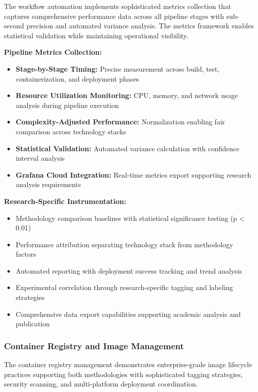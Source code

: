 The workflow automation implements sophisticated metrics collection that captures comprehensive performance data across all pipeline stages with sub-second precision and automated variance analysis. The metrics framework enables statistical validation while maintaining operational visibility.

\textbf{Pipeline Metrics Collection:}
\begin{itemize}
\item \textbf{Stage-by-Stage Timing:} Precise measurement across build, test, containerization, and deployment phases
\item \textbf{Resource Utilization Monitoring:} CPU, memory, and network usage analysis during pipeline execution
\item \textbf{Complexity-Adjusted Performance:} Normalization enabling fair comparison across technology stacks
\item \textbf{Statistical Validation:} Automated variance calculation with confidence interval analysis
\item \textbf{Grafana Cloud Integration:} Real-time metrics export supporting research analysis requirements
\end{itemize}

\textbf{Research-Specific Instrumentation:}
\begin{itemize}
\item Methodology comparison baselines with statistical significance testing (p < 0.01)
\item Performance attribution separating technology stack from methodology factors
\item Automated reporting with deployment success tracking and trend analysis
\item Experimental correlation through research-specific tagging and labeling strategies
\item Comprehensive data export capabilities supporting academic analysis and publication
\end{itemize}

\subsubsection{Container Registry and Image Management}

The container registry management demonstrates enterprise-grade image lifecycle practices supporting both methodologies with sophisticated tagging strategies, security scanning, and multi-platform deployment coordination.



